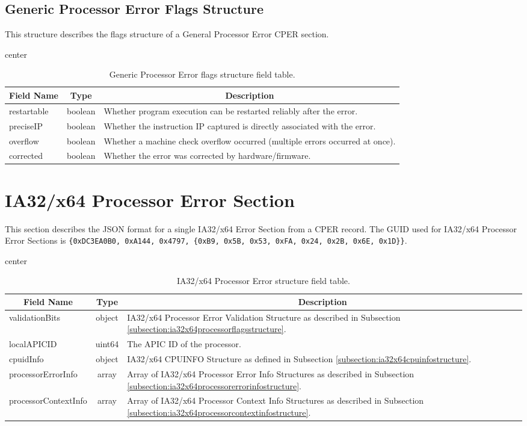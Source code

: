 \documentclass{report}
\newcommand*{\thead}[1]{\multicolumn{1}{|c|}{\bfseries #1}}
\newcommand*{\jsontable}[1]{
    \begin{table}[!ht]
    \label{#1}
    \centering
    \begin{adjustbox}{center}
    \begin{tabular}{|l|c|p{8cm}|}
    \hline
    \thead{Field Name} & \thead{Type} & \thead{Description} \\
    \hline
}
\newcommand*{\jsontableend}[1]{
    \hline
    \end{tabular}
    \end{adjustbox}
    \caption{#1}
    \label{table:#1}
    \end{table}
    \FloatBarrier
}
\begin{document}
\subsection{Generic Processor Error Flags Structure}
\label{subsection:genericprocessorflagsstructure}
This structure describes the flags structure of a General Processor Error CPER section.
\jsontable{table:genericprocessorflagsstructure}
restartable & boolean & Whether program execution can be restarted reliably after the error.\\
\hline
preciseIP & boolean & Whether the instruction IP captured is directly associated with the error.\\
\hline
overflow & boolean & Whether a machine check overflow occurred (multiple errors occurred at once).\\
\hline
corrected & boolean & Whether the error was corrected by hardware/firmware.\\
\jsontableend{Generic Processor Error flags structure field table.}

\section{IA32/x64 Processor Error Section}
\label{section:ia32x64errorsection}
This section describes the JSON format for a single IA32/x64 Error Section from a CPER record. The GUID used for IA32/x64 Processor Error Sections is \texttt{\{0xDC3EA0B0, 0xA144, 0x4797, \{0xB9, 0x5B, 0x53, 0xFA, 0x24, 0x2B, 0x6E, 0x1D\}\}}.
\jsontable{table:genericprocessorerrorsection}
validationBits & object & IA32/x64 Processor Error Validation Structure as described in Subsection \ref{subsection:ia32x64processorflagsstructure}.\\
\hline
localAPICID & uint64 & The APIC ID of the processor.\\
\hline
cpuidInfo & object & IA32/x64 CPUINFO Structure as defined in Subsection \ref{subsection:ia32x64cpuinfostructure}.\\
\hline
processorErrorInfo & array & Array of IA32/x64 Processor Error Info Structures as described in Subsection \ref{subsection:ia32x64processorerrorinfostructure}.\\
\hline
processorContextInfo & array & Array of IA32/x64 Processor Context Info Structures as described in Subsection \ref{subsection:ia32x64processorcontextinfostructure}.\\
\jsontableend{IA32/x64 Processor Error structure field table.}
\end{document}
